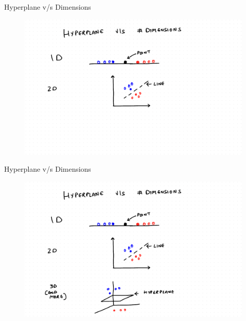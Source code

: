 \documentclass{beamer}
\begin{document}
\begin{frame}{Hyperplane v/s Dimensions}
\begin{figure}
    \includegraphics[width=\linewidth]{./SVM/Svm-6.pdf}  
\end{figure}
\end{frame}

\begin{frame}{Hyperplane v/s Dimensions}
\begin{figure}
    \includegraphics[width=\linewidth]{./SVM/Svm-7.pdf}  
\end{figure}
\end{frame}
\end{document}
